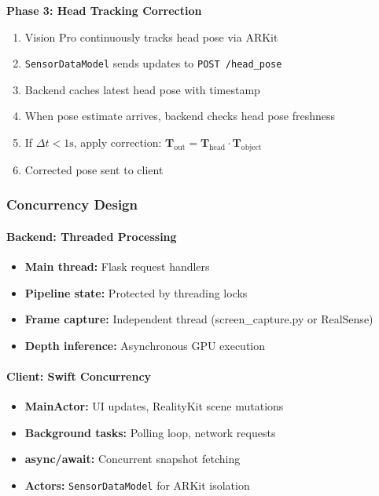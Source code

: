 \textbf{Phase 3: Head Tracking Correction}
\begin{enumerate}
    \item Vision Pro continuously tracks head pose via ARKit
    \item \texttt{SensorDataModel} sends updates to \texttt{POST /head\_pose}
    \item Backend caches latest head pose with timestamp
    \item When pose estimate arrives, backend checks head pose freshness
    \item If $\Delta t < 1\text{s}$, apply correction: $\mathbf{T}_{\text{out}} = \mathbf{T}_{\text{head}} \cdot \mathbf{T}_{\text{object}}$
    \item Corrected pose sent to client
\end{enumerate}

\subsubsection{Concurrency Design}

\paragraph{Backend: Threaded Processing}

\begin{itemize}
    \item \textbf{Main thread:} Flask request handlers
    \item \textbf{Pipeline state:} Protected by threading locks
    \item \textbf{Frame capture:} Independent thread (screen\_capture.py or RealSense)
    \item \textbf{Depth inference:} Asynchronous GPU execution
\end{itemize}

\paragraph{Client: Swift Concurrency}

\begin{itemize}
    \item \textbf{MainActor:} UI updates, RealityKit scene mutations
    \item \textbf{Background tasks:} Polling loop, network requests
    \item \textbf{async/await:} Concurrent snapshot fetching
    \item \textbf{Actors:} \texttt{SensorDataModel} for ARKit isolation
\end{itemize}

